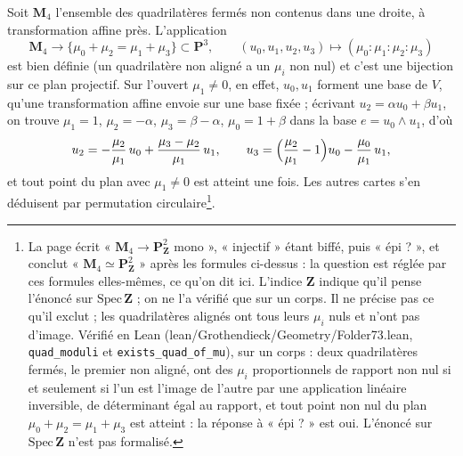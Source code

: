 \documentclass[11pt,a4paper]{article}
\begin{document}
Soit $\mathbf{M}_4$ l'ensemble des quadrilatères fermés non contenus dans une
droite, à transformation affine près. L'application
\[
  \mathbf{M}_4 \longrightarrow \bigl\{ \mu_0 + \mu_2 = \mu_1 + \mu_3 \bigr\}
  \subset \mathbf{P}^3, \qquad
  (u_0, u_1, u_2, u_3) \longmapsto (\mu_0 : \mu_1 : \mu_2 : \mu_3)
\]
est bien définie (un quadrilatère non aligné a un $\mu_i$ non nul) et c'est une
bijection sur ce plan projectif. Sur l'ouvert $\mu_1 \neq 0$, en effet,
$u_0, u_1$ forment une base de $V$, qu'une transformation affine envoie sur une
base fixée ; écrivant $u_2 = \alpha u_0 + \beta u_1$, on trouve
$\mu_1 = 1$, $\mu_2 = -\alpha$, $\mu_3 = \beta - \alpha$, $\mu_0 = 1 + \beta$
dans la base $e = u_0 \wedge u_1$, d'où
\[
  u_2 = -\frac{\mu_2}{\mu_1}\, u_0 + \frac{\mu_3 - \mu_2}{\mu_1}\, u_1 ,
  \qquad
  u_3 = \Bigl( \frac{\mu_2}{\mu_1} - 1 \Bigr) u_0 - \frac{\mu_0}{\mu_1}\, u_1 ,
\]
et tout point du plan avec $\mu_1 \neq 0$ est atteint une fois. Les autres
cartes s'en déduisent par permutation circulaire\footnote{La page écrit
« $\mathbf{M}_4 \to \mathbf{P}^2_{\mathbf{Z}}$ mono », « injectif » étant
biffé, puis « épi ? », et conclut « $\mathbf{M}_4 \simeq \mathbf{P}^2_{\mathbf{Z}}$ »
après les formules ci-dessus : la question est réglée par ces formules
elles-mêmes, ce qu'on dit ici. L'indice $\mathbf{Z}$ indique qu'il pense
l'énoncé sur $\mathrm{Spec}\,\mathbf{Z}$ ; on ne l'a vérifié que sur un corps.
Il ne précise pas ce qu'il exclut ; les quadrilatères alignés ont tous leurs
$\mu_i$ nuls et n'ont pas d'image. Vérifié en Lean
(lean/Grothendieck/Geometry/Folder73.lean, \texttt{quad\_moduli} et
\texttt{exists\_quad\_of\_mu}), sur un corps : deux quadrilatères fermés, le
premier non aligné, ont des $\mu_i$ proportionnels de rapport non nul si et
seulement si l'un est l'image de l'autre par une application linéaire
inversible, de déterminant égal au rapport, et tout point non nul du plan
$\mu_0 + \mu_2 = \mu_1 + \mu_3$ est atteint : la réponse à « épi ? » est oui.
L'énoncé sur $\mathrm{Spec}\,\mathbf{Z}$ n'est pas formalisé.}.
\end{document}
